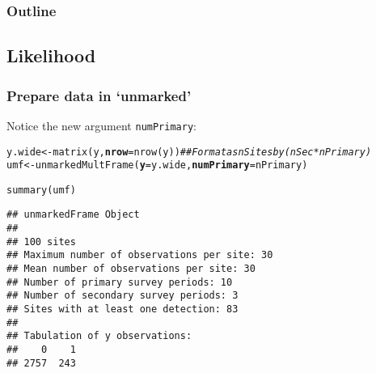 \documentclass[color=usenames,dvipsnames]{beamer}\usepackage[]{graphicx}\usepackage[]{color}
\makeatletter
\newcommand{\hlcom}[1]{\textcolor[rgb]{0.514,0.506,0.514}{\textit{#1}}}%
\newcommand{\hlstd}[1]{\textcolor[rgb]{0,0,0}{#1}}%
\newcommand{\hlkwb}[1]{\textcolor[rgb]{0,0.341,0.682}{#1}}%
\newcommand{\hlkwc}[1]{\textcolor[rgb]{0,0,0}{\textbf{#1}}}%
\newcommand{\hlkwd}[1]{\textcolor[rgb]{0.004,0.004,0.506}{#1}}%
\newenvironment{kframe}{%
 \def\at@end@of@kframe{}%
 \ifinner\ifhmode%
  \def\at@end@of@kframe{\end{minipage}}%
  \begin{minipage}{\columnwidth}%
 \fi\fi%
 \def\FrameCommand##1{\hskip\@totalleftmargin \hskip-\fboxsep
 \colorbox{shadecolor}{##1}\hskip-\fboxsep
     \hskip-\linewidth \hskip-\@totalleftmargin \hskip\columnwidth}%
 \MakeFramed {\advance\hsize-\width
   \@totalleftmargin\z@ \linewidth\hsize
   \@setminipage}}%
 {\par\unskip\endMakeFramed%
 \at@end@of@kframe}
\newenvironment{knitrout}{}{} %
\newcommand{\inr}[1]{\colorbox{inlinecolor}{\texttt{#1}}}
\makeatother
\begin{document}
\begin{frame}
  \frametitle{Outline}
  \Large
  \tableofcontents[currentsection]
\end{frame}



\subsection{Likelihood}



\begin{frame}[fragile]
  \frametitle{Prepare data in `unmarked'}
  \small
Notice the new argument \inr{numPrimary}:
\begin{knitrout}\scriptsize
{}\color{fgcolor}\begin{kframe}
\begin{alltt}
\hlstd{y.wide} \hlkwb{<-} \hlkwd{matrix}\hlstd{(y,} \hlkwc{nrow}\hlstd{=}\hlkwd{nrow}\hlstd{(y))} \hlcom{## Format as nSites by (nSec*nPrimary)}
\hlstd{umf} \hlkwb{<-} \hlkwd{unmarkedMultFrame}\hlstd{(}\hlkwc{y}\hlstd{=y.wide,} \hlkwc{numPrimary}\hlstd{=nPrimary)}
\end{alltt}
\end{kframe}
\end{knitrout}
\pause

\begin{knitrout}\scriptsize
{}\color{fgcolor}\begin{kframe}
\begin{alltt}
\hlkwd{summary}\hlstd{(umf)}
\end{alltt}
\begin{verbatim}
## unmarkedFrame Object
## 
## 100 sites
## Maximum number of observations per site: 30 
## Mean number of observations per site: 30 
## Number of primary survey periods: 10 
## Number of secondary survey periods: 3 
## Sites with at least one detection: 83 
## 
## Tabulation of y observations:
##    0    1 
## 2757  243
\end{verbatim}
\end{kframe}
\end{knitrout}
\end{frame}
\end{document}
